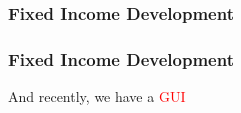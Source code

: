 \documentclass[compress]{beamer}
\begin{document}
\begin{frame}
	\frametitle{Fixed Income Development}
	\begin{center}
	\end{center}
\end{frame}
\begin{frame}
	\frametitle{Fixed Income Development}
	And recently, we have a \textcolor{red}{GUI}
	\begin{center}
	\end{center}
\end{frame}
\end{document}
